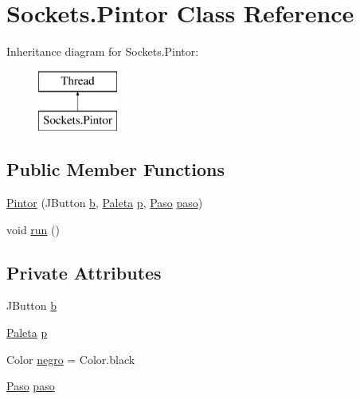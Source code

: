 \hypertarget{class_sockets_1_1_pintor}{}\section{Sockets.\+Pintor Class Reference}
\label{class_sockets_1_1_pintor}
Inheritance diagram for Sockets.\+Pintor\+:\begin{figure}[H]
\begin{center}
\leavevmode
\includegraphics[height=2.000000cm]{class_sockets_1_1_pintor}
\end{center}
\end{figure}
\subsection*{Public Member Functions}
\begin{DoxyCompactItemize}
\item 
\mbox{\hyperlink{class_sockets_1_1_pintor_a7ec9ea9ba4e21c302383a8d55c3cd97d}{Pintor}} (J\+Button \mbox{\hyperlink{class_sockets_1_1_pintor_a2b07cfc2a0f93afd9841f74ade3a61f8}{b}}, \mbox{\hyperlink{class_sockets_1_1_paleta}{Paleta}} \mbox{\hyperlink{class_sockets_1_1_pintor_a92e89c1dc89460b6da4128e8fd6a45ec}{p}}, \mbox{\hyperlink{class_sockets_1_1_paso}{Paso}} \mbox{\hyperlink{class_sockets_1_1_pintor_a2107c61fca16f1e39d835ac82eaf7f4d}{paso}})
\item 
void \mbox{\hyperlink{class_sockets_1_1_pintor_a7203e551c81501d2b04622d76ed1bf46}{run}} ()
\end{DoxyCompactItemize}
\subsection*{Private Attributes}
\begin{DoxyCompactItemize}
\item 
J\+Button \mbox{\hyperlink{class_sockets_1_1_pintor_a2b07cfc2a0f93afd9841f74ade3a61f8}{b}}
\item 
\mbox{\hyperlink{class_sockets_1_1_paleta}{Paleta}} \mbox{\hyperlink{class_sockets_1_1_pintor_a92e89c1dc89460b6da4128e8fd6a45ec}{p}}
\item 
Color \mbox{\hyperlink{class_sockets_1_1_pintor_aaeaa548dd4f01d22c45f0dbc48373ec6}{negro}} = Color.\+black
\item 
\mbox{\hyperlink{class_sockets_1_1_paso}{Paso}} \mbox{\hyperlink{class_sockets_1_1_pintor_a2107c61fca16f1e39d835ac82eaf7f4d}{paso}}
\end{DoxyCompactItemize}


